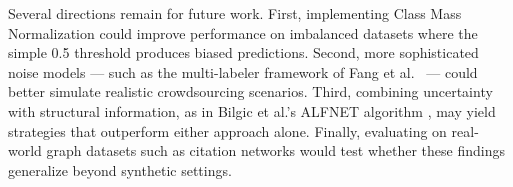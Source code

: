 \documentclass[12pt]{article}
\begin{document}
Several directions remain for future work. First, implementing Class Mass Normalization \cite{Zhu2003} could improve performance on imbalanced datasets where the simple 0.5 threshold produces biased predictions. Second, more sophisticated noise models --- such as the multi-labeler framework of Fang et al.\ \cite{Fang2014} --- could better simulate realistic crowdsourcing scenarios. Third, combining uncertainty with structural information, as in Bilgic et al.'s ALFNET algorithm \cite{Bilgic2010}, may yield strategies that outperform either approach alone. Finally, evaluating on real-world graph datasets such as citation networks \cite{Bilgic2010} would test whether these findings generalize beyond synthetic settings.


\end{document}
